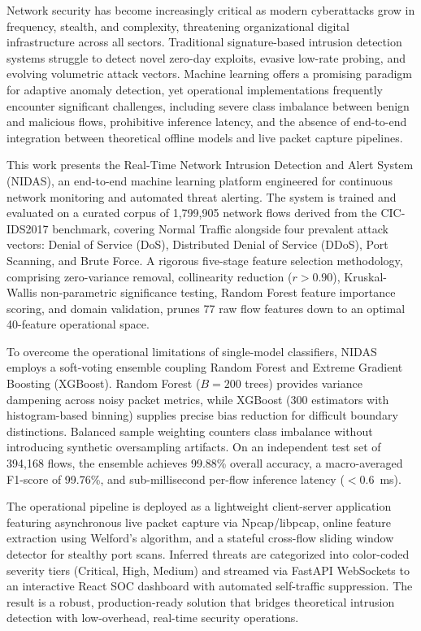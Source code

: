 \documentclass[12pt,a4paper]{report}
\begin{document}
Network security has become increasingly critical as modern cyberattacks grow in frequency, stealth, and complexity, threatening organizational digital infrastructure across all sectors. Traditional signature-based intrusion detection systems struggle to detect novel zero-day exploits, evasive low-rate probing, and evolving volumetric attack vectors. Machine learning offers a promising paradigm for adaptive anomaly detection, yet operational implementations frequently encounter significant challenges, including severe class imbalance between benign and malicious flows, prohibitive inference latency, and the absence of end-to-end integration between theoretical offline models and live packet capture pipelines.

This work presents the Real-Time Network Intrusion Detection and Alert System (NIDAS), an end-to-end machine learning platform engineered for continuous network monitoring and automated threat alerting. The system is trained and evaluated on a curated corpus of 1,799,905 network flows derived from the CIC-IDS2017 benchmark, covering Normal Traffic alongside four prevalent attack vectors: Denial of Service (DoS), Distributed Denial of Service (DDoS), Port Scanning, and Brute Force. A rigorous five-stage feature selection methodology, comprising zero-variance removal, collinearity reduction ($r > 0.90$), Kruskal-Wallis non-parametric significance testing, Random Forest feature importance scoring, and domain validation, prunes 77 raw flow features down to an optimal 40-feature operational space.

To overcome the operational limitations of single-model classifiers, NIDAS employs a soft-voting ensemble coupling Random Forest and Extreme Gradient Boosting (XGBoost). Random Forest ($B = 200$ trees) provides variance dampening across noisy packet metrics, while XGBoost (300 estimators with histogram-based binning) supplies precise bias reduction for difficult boundary distinctions. Balanced sample weighting counters class imbalance without introducing synthetic oversampling artifacts. On an independent test set of 394,168 flows, the ensemble achieves 99.88\% overall accuracy, a macro-averaged F1-score of 99.76\%, and sub-millisecond per-flow inference latency ($< 0.6$~ms).

The operational pipeline is deployed as a lightweight client-server application featuring asynchronous live packet capture via Npcap/libpcap, online feature extraction using Welford's algorithm, and a stateful cross-flow sliding window detector for stealthy port scans. Inferred threats are categorized into color-coded severity tiers (Critical, High, Medium) and streamed via FastAPI WebSockets to an interactive React SOC dashboard with automated self-traffic suppression. The result is a robust, production-ready solution that bridges theoretical intrusion detection with low-overhead, real-time security operations.
\end{document}
